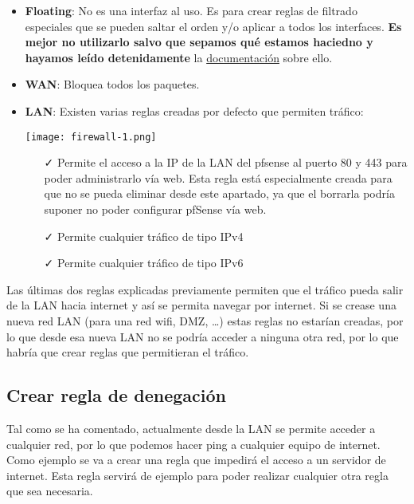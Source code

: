\begin{itemize}
    \item \textbf{Floating}: No es una interfaz al uso. Es para crear reglas de filtrado especiales que se pueden saltar el orden y/o aplicar a todos los interfaces. \textbf{Es mejor no utilizarlo salvo que sepamos qué estamos haciedno y hayamos leído detenidamente} la \href{https://docs.netgate.com/pfsense/en/latest/firewall/floating-rules.html}{documentación} sobre ello.
    \item \textbf{WAN}: Bloquea todos los paquetes.
    \item \textbf{LAN}: Existen varias reglas creadas por defecto que permiten tráfico:

    \begin{center}
        \texttt{[image: firewall-1.png]}
    \end{center}

    \begin{enumerate}
        \item[\faCheck] Permite el acceso a la IP de la LAN del pfsense al puerto 80 y 443 para poder administrarlo vía web. Esta regla está especialmente creada para que no se pueda eliminar desde este apartado, ya que el borrarla podría suponer no poder configurar pfSense vía web.
        \item[\faCheck] Permite cualquier tráfico de tipo IPv4
        \item[\faCheck] Permite cualquier tráfico de tipo IPv6
    \end{enumerate}
\end{itemize}

Las últimas dos reglas explicadas previamente permiten que el tráfico pueda salir de la LAN hacia internet y así se permita navegar por internet. Si se crease una nueva red LAN (para una red wifi, DMZ, …) estas reglas no estarían creadas, por lo que desde esa nueva LAN no se podría acceder a ninguna otra red, por lo que habría que crear reglas que permitieran el tráfico.

\subsection{Crear regla de denegación}
Tal como se ha comentado, actualmente desde la LAN se permite acceder a cualquier red, por lo que podemos hacer ping a cualquier equipo de internet. Como ejemplo se va a crear una regla que impedirá el acceso a un servidor de internet. Esta regla servirá de ejemplo para poder realizar cualquier otra regla que sea necesaria.

